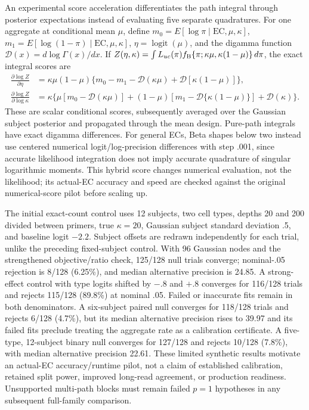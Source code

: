 \documentclass[11pt]{article}
\begin{document}
An experimental score acceleration differentiates the path integral through posterior expectations instead of evaluating five separate quadratures. For one aggregate at conditional mean \(\mu\), define \(m_0=E[\log\pi\mid\mathrm{EC},\mu,\kappa]\), \(m_1=E[\log(1-\pi)\mid\mathrm{EC},\mu,\kappa]\), \(\eta=\operatorname{logit}(\mu)\), and the digamma function \(\mathcal D(x)=d\log\Gamma(x)/dx\). If \(Z(\eta,\kappa)=\int L_{uc}(\pi)f_{\rm B}\{\pi;\kappa\mu,\kappa(1-\mu)\}\,d\pi\), the exact integral scores are \begin{equation}\begin{aligned}\frac{\partial\log Z}{\partial\eta}&=\kappa\mu(1-\mu)\{m_0-m_1-\mathcal D(\kappa\mu)+\mathcal D[\kappa(1-\mu)]\},\\ \frac{\partial\log Z}{\partial\log\kappa}&=\kappa\{\mu[m_0-\mathcal D(\kappa\mu)]+(1-\mu)[m_1-\mathcal D\{\kappa(1-\mu)\}]+\mathcal D(\kappa)\}.\end{aligned}\end{equation} These are scalar conditional scores, subsequently averaged over the Gaussian subject posterior and propagated through the mean design. Pure-path integrals have exact digamma differences. For general ECs, Beta shapes below two instead use centered numerical logit/log-precision differences with step .001, since accurate likelihood integration does not imply accurate quadrature of singular logarithmic moments. This hybrid score changes numerical evaluation, not the likelihood; its actual-EC accuracy and speed are checked against the original numerical-score pilot before scaling up.

The initial exact-count control uses 12 subjects, two cell types, depths 20 and 200 divided between primers, true \(\kappa=20\), Gaussian subject standard deviation .5, and baseline logit \(-2.2\). Subject offsets are redrawn independently for each trial, unlike the preceding fixed-subject control. With 96 Gaussian nodes and the strengthened objective/ratio check, 125/128 null trials converge; nominal-.05 rejection is 8/128 (6.25\%), and median alternative precision is 24.85. A strong-effect control with type logits shifted by \(-.8\) and \(+.8\) converges for 116/128 trials and rejects 115/128 (89.8\%) at nominal .05. Failed or inaccurate fits remain in both denominators. A six-subject paired null converges for 118/128 trials and rejects 6/128 (4.7\%), but its median alternative precision rises to 39.97 and its failed fits preclude treating the aggregate rate as a calibration certificate. A five-type, 12-subject binary null converges for 127/128 and rejects 10/128 (7.8\%), with median alternative precision 22.61. These limited synthetic results motivate an actual-EC accuracy/runtime pilot, not a claim of established calibration, retained split power, improved long-read agreement, or production readiness. Unsupported multi-path blocks must remain failed \(p=1\) hypotheses in any subsequent full-family comparison.
\end{document}
